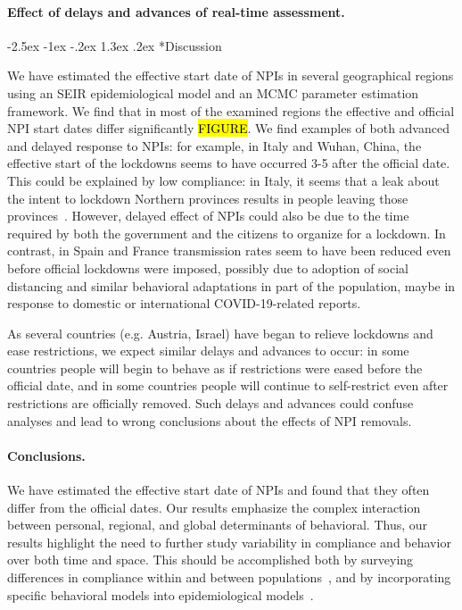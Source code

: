 \documentclass[12pt]{extarticle}
\makeatletter
\renewcommand\section{\@startsection {section}{1}{\z@}%
     {-2.5ex \@plus -1ex \@minus -.2ex}%
     {1.3ex \@plus.2ex}%
    {\Large\bfseries}}
\makeatother
\begin{document}
\paragraph*{Effect of delays and advances of real-time assessment.}



\pagebreak
\section*{Discussion}

We have estimated the effective start date of NPIs in several geographical regions using an SEIR epidemiological model and an MCMC parameter estimation framework.
We find that in most of the examined regions the effective and official NPI start dates differ significantly \hl{FIGURE}.
We find examples of both advanced and delayed response to NPIs: for example, in Italy and Wuhan, China, the effective start of the lockdowns seems to have occurred 3-5 after the official date. This could be explained by low compliance: in Italy, it seems that a leak about the intent to lockdown Northern provinces results in people leaving those provinces~\citep{Gatto2020}. However, delayed effect of NPIs could also be due to the time required by both the government and the citizens to organize for a lockdown. 
In contrast, in Spain and France transmission rates seem to have been reduced even before official lockdowns were imposed, possibly due to adoption of social distancing and similar behavioral adaptations in part of the population, maybe in response to domestic or international COVID-19-related reports.

As several countries (e.g. Austria, Israel) have began to relieve lockdowns and ease restrictions, we expect similar delays and advances to occur: in some countries people will begin to behave as if restrictions were eased before the official date, and in some countries people will continue to self-restrict even after restrictions are officially removed.
Such delays and advances could confuse analyses and lead to wrong conclusions about the effects of NPI removals.


\paragraph*{Conclusions.}
We have estimated the effective start date of NPIs and found that they often differ from the official dates.
Our results emphasize the complex interaction between personal, regional, and global determinants of behavioral. Thus, our results highlight the need to further study variability in compliance and behavior over both time and space. This should be accomplished both by surveying differences in compliance within and between populations~\citep{Atchison2020}, and by incorporating specific behavioral models into epidemiological models~\citep{Arthur2020}.
\end{document}
